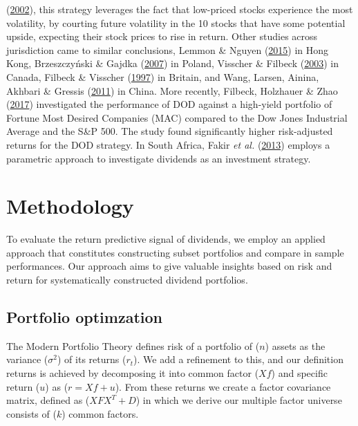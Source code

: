 \documentclass[10pt,preprint, authoryear]{elsarticle}
\numberwithin{equation}{section}
\numberwithin{figure}{section}
\numberwithin{table}{section}
\begin{document}
(\protect\hyperlink{ref-gardner2002motley}{2002}), this strategy
leverages the fact that low-priced stocks experience the most
volatility, by courting future volatility in the 10 stocks that have
some potential upside, expecting their stock prices to rise in return.
Other studies across jurisdiction came to similar conclusions, Lemmon \&
Nguyen (\protect\hyperlink{ref-lemmon2015dividend}{2015}) in Hong Kong,
Brzeszczyński \& Gajdka
(\protect\hyperlink{ref-brzeszczynski2007dividend}{2007}) in Poland,
Visscher \& Filbeck (\protect\hyperlink{ref-visscher2003dividend}{2003})
in Canada, Filbeck \& Visscher
(\protect\hyperlink{ref-filbeck1997}{1997}) in Britain, and Wang,
Larsen, Ainina, Akhbari \& Gressis
(\protect\hyperlink{ref-wang2011dogs}{2011}) in China. More recently,
Filbeck, Holzhauer \& Zhao
(\protect\hyperlink{ref-filbeck2017dividend}{2017}) investigated the
performance of DOD against a high-yield portfolio of Fortune Most
Desired Companies (MAC) compared to the Dow Jones Industrial Average and
the S\&P 500. The study found significantly higher risk-adjusted returns
for the DOD strategy. In South Africa, Fakir \emph{et al.}
(\protect\hyperlink{ref-fakir2013dividend}{2013}) employs a parametric
approach to investigate dividends as an investment strategy.

\hypertarget{methodology}{%
\section*{Methodology}\label{methodology}}

To evaluate the return predictive signal of dividends, we employ an
applied approach that constitutes constructing subset portfolios and
compare in sample performances. Our approach aims to give valuable
insights based on risk and return for systematically constructed
dividend portfolios.

\hypertarget{portfolio-optimzation}{%
\subsection*{Portfolio optimzation}\label{portfolio-optimzation}}

The Modern Portfolio Theory defines risk of a portfolio of (\(n\))
assets as the variance (\(\sigma^2\)) of its returns (\(r_{t}\)). We add
a refinement to this, and our definition returns is achieved by
decomposing it into common factor (\(Xf\)) and specific return (\(u\))
as (\(r = Xf+ u\)). From these returns we create a factor covariance
matrix, defined as (\(X F X^T+D\)) in which we derive our multiple
factor universe consists of (\(k\)) common factors.
\end{document}
